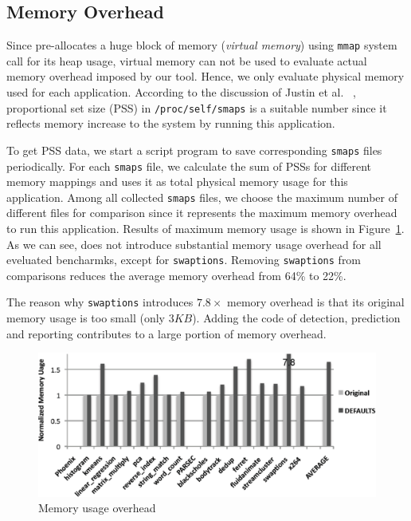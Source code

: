 \subsection{Memory Overhead}
\label{sec:memoverhead}
Since \Predator{} pre-allocates a huge block of memory ({\it virtual memory}) 
using \texttt{mmap} system call for its heap usage, 
virtual memory can not be used to evaluate actual memory overhead imposed by our tool. 
Hence, we only evaluate physical memory used for each application. 
According to the discussion of Justin et al. ~\cite{memusage}, proportional set size (PSS) 
in \texttt{/proc/self/smaps} is a suitable number since it reflects memory increase to the system
by running this application. 

To get PSS data, we start a script program to save 
corresponding \texttt{smaps} files periodically.
For each \texttt{smaps} file, we calculate the sum of PSSs for different
memory mappings and uses it as total physical memory usage for this application.
Among all collected \texttt{smaps} files, we choose the maximum number of
different files for comparison since it represents the maximum memory overhead to run this application.
Results of maximum memory usage is shown in Figure~\ref{fig:memusage}. As we can see,
\Predator{} does not introduce substantial memory usage overhead 
for all eveluated bencharmks, except for \texttt{swaptions}. 
Removing \texttt{swaptions} from comparisons reduces 
the average memory overhead from 64\% to 22\%. 

The reason why \texttt{swaptions} introduces $7.8\times$ memory overhead is that 
its original memory usage is too small (only $3KB$).
Adding the code of detection, prediction and
reporting contributes to a large portion of memory overhead. 

\begin{figure}
\begin{center} 
\includegraphics[width=6.5in]{fig/memusage}
\end{center}
\caption{Memory usage overhead}
\label{fig:memusage}
\end{figure}


